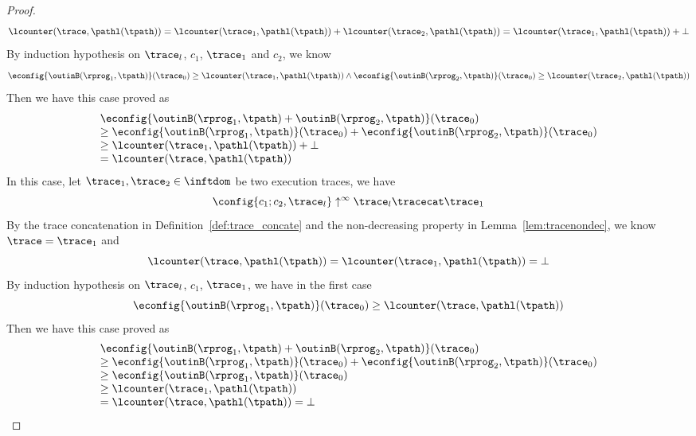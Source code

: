 \begin{proof}
\[
  \lcounter(\trace, \pathl(\tpath))  = 
  \lcounter(\trace_1,  \pathl(\tpath))  + \lcounter(\trace_2,  \pathl(\tpath)) = \lcounter(\trace_1,  \pathl(\tpath)) + \bot
\]
By induction hypothesis on $\trace_l$, $c_1$, $\trace_1$ and $c_2$, we know
\[
  \econfig{\outinB(\rprog_1, \tpath)}(\trace_0) \geq \lcounter(\trace_1,  \pathl(\tpath)) 
  \land 
  \econfig{\outinB(\rprog_2, \tpath)}(\trace_0)  \geq \lcounter(\trace_2,  \pathl(\tpath))  
\]
Then we have this case proved as
\[
  \begin{array}{l}
  \econfig{\outinB(\rprog_1, \tpath) + \outinB(\rprog_2, \tpath)}(\trace_0)
  \\
  \geq \econfig{\outinB(\rprog_1, \tpath)}(\trace_0) + \econfig{\outinB(\rprog_2, \tpath)}(\trace_0)
  \\
  \geq \lcounter(\trace_1,  \pathl(\tpath))  + \bot 
  \\
  = \lcounter(\trace, \pathl(\tpath))
  \end{array}
  \] 
  In this case, let $\trace_1, \trace_2 \in \inftdom$ be two execution traces, we have
  \[
    \config{c_1; c_2, \trace_l} \uparrow^{\infty} \trace_l \tracecat \trace_1
  \]
  By the trace concatenation in Definition~\ref{def:trace_concate} and the non-decreasing property in Lemma~\ref{lem:tracenondec}, we know $\trace = \trace_1$ and
  \[
    \lcounter(\trace, \pathl(\tpath))  = \lcounter(\trace_1, \pathl(\tpath))  = \bot
  \]
  By induction hypothesis on $\trace_l$, $c_1$, $\trace_1$, we have
  in the first case
  \[
    \econfig{\outinB(\rprog_1, \tpath)}(\trace_0) \geq \lcounter(\trace,  \pathl(\tpath)) 
  \]
  Then we have this case proved as
  \[
    \begin{array}{l}
    \econfig{\outinB(\rprog_1, \tpath) + \outinB(\rprog_2, \tpath)}(\trace_0)
    \\
    \geq \econfig{\outinB(\rprog_1, \tpath)}(\trace_0) + \econfig{\outinB(\rprog_2, \tpath)}(\trace_0)
    \\
    \geq \econfig{\outinB(\rprog_1, \tpath)}(\trace_0)
    \\
    \geq \lcounter(\trace_1,  \pathl(\tpath))
    \\
    = \lcounter(\trace, \pathl(\tpath))
    = \bot
    \end{array}
    \] 
   

\end{proof}
